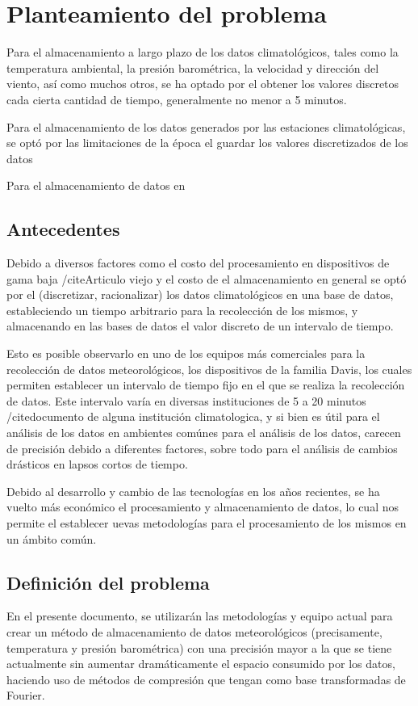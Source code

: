 \section{Planteamiento del problema}

Para el almacenamiento a largo plazo de los datos climatológicos, tales como la temperatura ambiental, la presión barométrica, la velocidad y dirección del viento, así como muchos otros, se ha optado por el obtener los valores discretos cada cierta cantidad de tiempo, generalmente no menor a 5 minutos.


Para el almacenamiento de los datos generados por las estaciones climatológicas, se optó por las limitaciones de la época el guardar los valores discretizados de los datos \cite{Marshall_1994}

Para el almacenamiento de datos en

\subsection{Antecedentes}

Debido a diversos factores como el costo del procesamiento en dispositivos de gama baja /cite{Articulo viejo} y el costo de el almacenamiento en general \cite{Marshall_1994} se optó por el (discretizar, racionalizar) los datos climatológicos en una base de datos, estableciendo un tiempo arbitrario para la recolección de los mismos, y almacenando en las bases de datos el valor discreto de un intervalo de tiempo.

Esto es posible observarlo en uno de los equipos más comerciales para la recolección de datos meteorológicos, los dispositivos de la familia Davis, los cuales permiten establecer un intervalo de tiempo fijo en el que se realiza la recolección de datos. Este intervalo varía en diversas instituciones de 5 a 20 minutos /cite{documento de alguna institución climatologica}, y si bien es útil para el análisis de los datos en ambientes comúnes para el análisis de los datos, carecen de precisión debido a diferentes factores, sobre todo para el análisis de cambios drásticos en lapsos cortos de tiempo.

Debido al desarrollo y cambio de las tecnologías en los años recientes, se ha vuelto más económico el procesamiento y almacenamiento de datos, lo cual nos permite el establecer uevas metodologías para el procesamiento de los mismos en un ámbito común.

\subsection{Definición del problema}

En el presente documento, se utilizarán las metodologías y equipo actual para crear un método de almacenamiento de datos meteorológicos (precisamente, temperatura y presión barométrica) con una precisión mayor a la que se tiene actualmente sin aumentar dramáticamente el espacio consumido por los datos, haciendo uso de métodos de compresión que tengan como base transformadas de Fourier.
